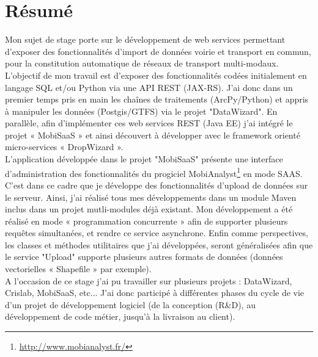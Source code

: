 \chapter*{Résumé}\label{Resume}

Mon sujet de stage porte sur le développement de web services permettant d’exposer des fonctionnalités d’import de données voirie et transport en commun, pour la constitution automatique de réseaux de transport multi-modaux. \\

L'objectif de mon travail est d'exposer des fonctionnalités codées initialement en langage SQL et/ou Python via une API REST (JAX-RS). J'ai donc dans un premier temps pris en main les chaînes de traitements (ArcPy/Python) et appris à manipuler les données (Postgis/GTFS) via le projet "DataWizard". En parallèle, afin d'implémenter ces web services REST (Java EE) j'ai intégré le projet « MobiSaaS » et ainsi découvert à développer avec le framework orienté micro-services « DropWizard ». \\

L'application développée dans le projet "MobiSaaS" présente une interface d'administration des fonctionnalités du progiciel MobiAnalyst\footnote{\url{http://www.mobianalyst.fr/}} en mode SAAS. C'est dans ce cadre que je développe des fonctionnalités d'upload de données sur le serveur. Ainsi, j'ai réalisé tous mes développements dans un module Maven inclus dans un projet mutli-modules déjà existant. Mon développement a été réalisé en mode « programmation concurrente » afin de supporter plusieurs requêtes simultanées, et rendre ce service asynchrone. Enfin comme perspectives, les classes et méthodes utilitaires que j'ai développées, seront généralisées afin que le service "Upload" supporte plusieurs autres formats de données (données vectorielles « Shapefile » par exemple).\\

A l'occasion de ce stage j'ai pu travailler sur plusieurs projets : DataWizard,  Crislab,  MobiSaaS, etc... J'ai donc participé à différentes phases du cycle de vie d'un projet de développement logiciel (de la conception (R\&D), au développement de code métier, jusqu'à la livraison au client).\\